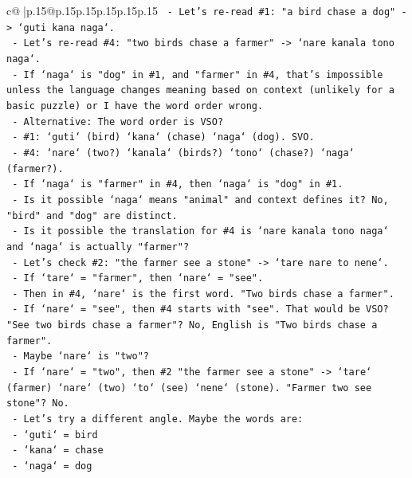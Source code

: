 \documentclass{article}
\begin{document}
{\begin{supertabular}{c@{$\;$}|p{.15\linewidth}@{}p{.15\linewidth}p{.15\linewidth}p{.15\linewidth}p{.15\linewidth}p{.15\linewidth}}
{{{\texttt{             {-} Let's re{-}read \#1: "a bird chase a dog" {-}> `guti kana naga`.} \\
\texttt{             {-} Let's re{-}read \#4: "two birds chase a farmer" {-}> `nare kanala tono naga`.} \\
\texttt{             {-} If `naga` is "dog" in \#1, and "farmer" in \#4, that's impossible unless the language changes meaning based on context (unlikely for a basic puzzle) or I have the word order wrong.} \\
\texttt{             {-} Alternative: The word order is VSO?} \\
\texttt{               {-} \#1: `guti` (bird) `kana` (chase) `naga` (dog). SVO.} \\
\texttt{               {-} \#4: `nare` (two?) `kanala` (birds?) `tono` (chase?) `naga` (farmer?).} \\
\texttt{               {-} If `naga` is "farmer" in \#4, then `naga` is "dog" in \#1.} \\
\texttt{               {-} Is it possible `naga` means "animal" and context defines it? No, "bird" and "dog" are distinct.} \\
\texttt{               {-} Is it possible the translation for \#4 is `nare kanala tono naga` and `naga` is actually "farmer"?} \\
\texttt{               {-} Let's check \#2: "the farmer see a stone" {-}> `tare nare to nene`.} \\
\texttt{                 {-} If `tare` = "farmer", then `nare` = "see".} \\
\texttt{                 {-} Then in \#4, `nare` is the first word. "Two birds chase a farmer".} \\
\texttt{                 {-} If `nare` = "see", then \#4 starts with "see". That would be VSO? "See two birds chase a farmer"? No, English is "Two birds chase a farmer".} \\
\texttt{                 {-} Maybe `nare` is "two"?} \\
\texttt{                   {-} If `nare` = "two", then \#2 "the farmer see a stone" {-}> `tare` (farmer) `nare` (two) `to` (see) `nene` (stone). "Farmer two see stone"? No.} \\
\texttt{             {-} Let's try a different angle. Maybe the words are:} \\
\texttt{               {-} `guti` = bird} \\
\texttt{               {-} `kana` = chase} \\
\texttt{               {-} `naga` = dog} \\
}}}
\end{supertabular}}
\end{document}
